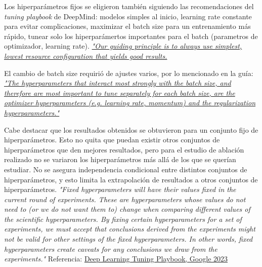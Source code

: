 \documentclass[12pt, a4paper]{article}
\begin{document}
Los hiperparámetros fijos se eligieron también siguiendo las recomendaciones del \textit{tuning playbook} de DeepMind: modelos simples al inicio, learning rate constante para evitar complicaciones, maximizar el batch size para un entrenamiento más rápido, tunear solo los hiperparámertos importantes para el batch (parametros de optimizador, learning rate). \href{https://github.com/google-research/tuning_playbook#choosing-the-optimizer:~:text=Our%20guiding%20principle%20is%20to,%28see%20Shallue%20et%20al%2E%202018%29%2E}{\textit{"Our guiding principle is to always use simplest, lowest resource configuration that yields good results.}}

El cambio de batch size requirió de ajustes varios, por lo mencionado en la guía: \href{https://github.com/google-research/tuning_playbook#choosing-the-optimizer:~:text=The%20hyperparameters%20that%20interact%20most%20strongly%20with%20the%20batch%20size%2C%20and%20therefore%20are%20most%20important%20to%20tune%20separately%20for%20each%20batch%20size%2C%20are%20the%20optimizer%20hyperparameters%20%28e%2Eg%2E%20learning%20rate%2C%20momentum%29%20and%20the%20regularization%20hyperparameters%2E}{\textit{"The hyperparameters that interact most strongly with the batch size, and therefore are most important to tune separately for each batch size, are the optimizer hyperparameters (e.g. learning rate, momentum) and the regularization hyperparameters."}}

Cabe destacar que los resultados obtenidos se obtuvieron para un conjunto fijo de hiperparámetros. Esto no quita que puedan existir otros conjuntos de hiperparámetros que den mejores resultados, pero para el estudio de ablación realizado no se variaron los hiperparámetros más allá de los que se querían estudiar. No se asegura independencia condicional entre distintos conjuntos de hiperparámetros, y esto limita la extrapolación de resultados a otros conjuntos de hiperparámetros. 
\textit{"Fixed hyperparameters will have their values fixed in the current round of experiments. These are hyperparameters whose values do not need to (or we do not want them to) change when comparing different values of the scientific hyperparameters. By fixing certain hyperparameters for a set of experiments, we must accept that conclusions derived from the experiments might not be valid for other settings of the fixed hyperparameters. In other words, fixed hyperparameters create caveats for any conclusions we draw from the experiments."} 
Referencia: \href{https://github.com/google-research/tuning_playbook#identifying-scientific-nuisance-and-fixed-hyperparameters}{Deep Learning Tuning Playbook, Google 2023}
\end{document}
